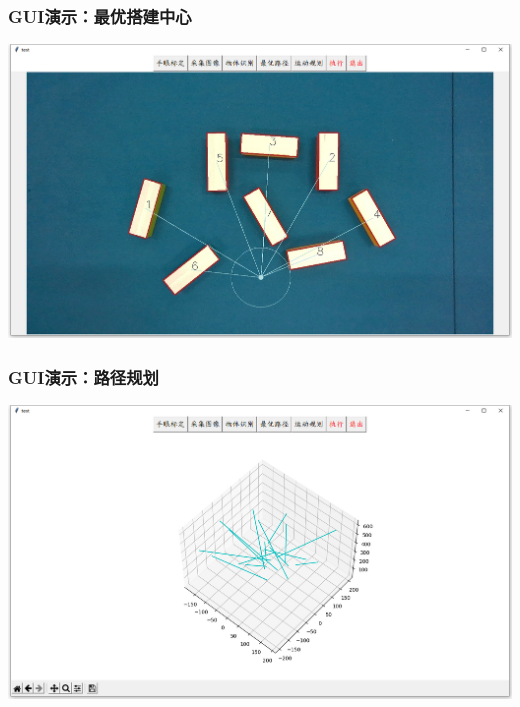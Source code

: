 \documentclass{beamer}
\begin{document}
\begin{frame}
    \frametitle{GUI演示：最优搭建中心}
    \centering
    \includegraphics[scale=0.25]{路径规划.png}
\end{frame}

\begin{frame}
    \frametitle{GUI演示：路径规划}
    \centering
    \includegraphics[scale=0.25]{运动规划_2.png}
\end{frame}
\end{document}
